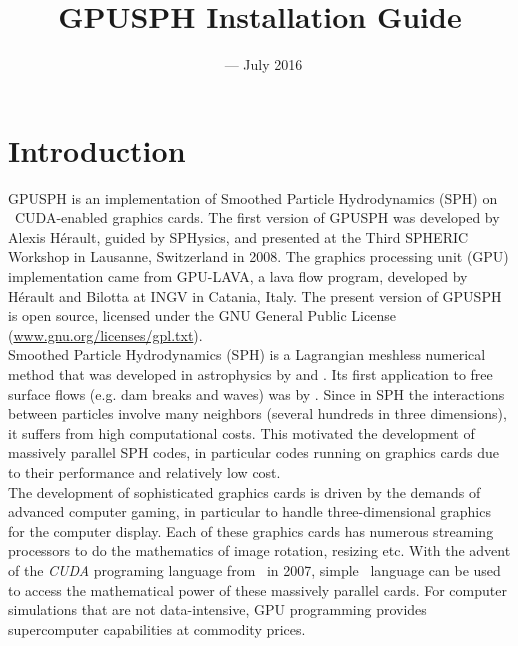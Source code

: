 \documentclass{../GPUSPHtemplate}
\title{GPUSPH Installation Guide}
\author{}
\date{\currentver\ --- July 2016}
\begin{document}
\maketitle
\tableofcontents
\newpage

\section{Introduction}

GPUSPH is an implementation of Smoothed Particle Hydrodynamics (SPH) on
\nvidia\ CUDA-enabled graphics cards. The first version of GPUSPH was
developed by Alexis Hérault, guided by SPHysics, and presented at the
Third SPHERIC Workshop in Lausanne, Switzerland in 2008. 
The graphics processing unit (GPU) implementation came from GPU-LAVA, 
a lava flow program, developed by Hérault and Bilotta at INGV in 
Catania, Italy. The present version of GPUSPH is open source, 
licensed under the GNU General Public License
(\url{www.gnu.org/licenses/gpl.txt}). \\

Smoothed Particle Hydrodynamics (SPH) is a Lagrangian meshless numerical
method that was developed in astrophysics by \cite{lucy_numerical_1977} and
\cite{gingold_smoothed_1977}. Its first application to free surface flows (e.g.
dam breaks and waves) was by \cite{monaghan_volcanoes_1994}.
Since in SPH the interactions between particles involve many neighbors
(several hundreds in three dimensions), it suffers from high computational costs.
This motivated the development of massively parallel SPH codes,
in particular codes running on graphics cards due to their performance and relatively
low cost.\\

The development of sophisticated graphics cards is driven by the demands of 
advanced computer gaming, in particular to handle three-dimensional 
graphics for the computer display. Each of these
graphics cards has numerous streaming processors to do the mathematics
of image rotation, resizing etc. With the advent of the {\em CUDA}
programing language from \nvidia\ in 2007, simple \cpp\ language can be used
to access the mathematical power of these massively parallel cards. For
computer simulations that are not data-intensive, GPU programming
provides supercomputer capabilities at commodity prices.\\
\end{document}
